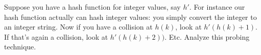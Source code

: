 Suppose you have a hash function for integer values, say $h'$.
For instance our hash function
actually can hash integer values: you simply convert the 
integer to an integer string. 
Now if you have a collision at $h(k)$, look at $h'(h(k) + 1)$.
If that's again a collision, look at $h'(h(k) + 2))$.
Etc.
Analyze this probing technique.
